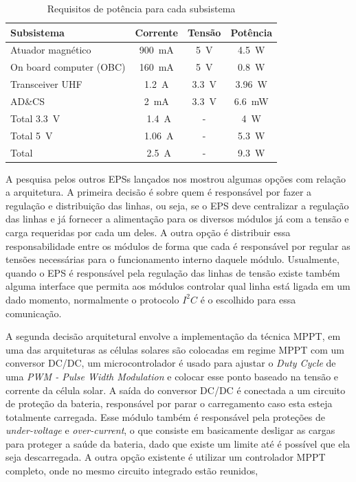 \begin{table}[!ht]
    \centering
    \begin{tabular}{l|ccc}
        Subsistema & Corrente & Tensão & Potência \\
        \hline
        Atuador magnético & \SI{900}{\milli\ampere} & \SI{5}{\volt} & \SI{4,5}{\watt}\\
        On board computer (OBC) & \SI{160}{\milli\ampere} & \SI{5}{\volt} & \SI{0.8}{\watt}\\
        Transceiver UHF & \SI{1.2}{\ampere} & \SI{3.3}{\volt} & \SI{3.96}{\watt}\\
        AD\&CS & \SI{2}{\milli\ampere} & \SI{3.3}{\volt} & \SI{6.6}{\milli\watt}\\
        \hline
        Total \SI{3.3}{\volt} & ~\SI{1.4}{\ampere} & - & \SI{4}{\watt}\\
        Total \SI{5}{\volt} & ~\SI{1.06}{\ampere} & - & \SI{5.3}{\watt}\\ \hline
        Total & ~\SI{2.5}{\ampere} & - & \SI{9.3}{\watt}\\
    \end{tabular}
    \caption{Requisitos de potência para cada subsistema}
    \label{tab:requisites_modules}
\end{table}

A pesquisa pelos outros EPSs lançados nos mostrou algumas opções com relação a arquitetura. A primeira decisão é sobre quem é responsável por fazer a regulação e distribuição das linhas, ou seja, se o EPS deve centralizar a regulação das linhas e já fornecer a alimentação para os diversos módulos já com a tensão e carga requeridas por cada um deles. A outra opção é distribuir essa responsabilidade entre os módulos de forma que cada é responsável por regular as tensões necessárias para o funcionamento interno daquele módulo. Usualmente, quando o EPS é responsável pela regulação das linhas de tensão existe também alguma interface que permita aos módulos controlar qual linha está ligada em um dado momento, normalmente o protocolo $I^{2}C$ é o escolhido para essa comunicação.

A segunda decisão arquitetural envolve a implementação da técnica MPPT, em uma das arquiteturas as células solares são colocadas em regime MPPT com um conversor DC/DC, um microcontrolador é usado para ajustar o \textit{Duty Cycle} de uma \textit{PWM - Pulse Width Modulation} e colocar esse ponto baseado na tensão e corrente da célula solar. A saída do conversor DC/DC é conectada a um circuito de proteção da bateria, responsável por parar o carregamento caso esta esteja totalmente carregada. Esse módulo também é responsável pela proteções de \textit{under-voltage} e \textit{over-current}, o que consiste em basicamente desligar as cargas para proteger a saúde da bateria, dado que existe um limite até é possível que ela seja descarregada. A outra opção existente é utilizar um controlador MPPT completo, onde no mesmo circuito integrado estão reunidos,

